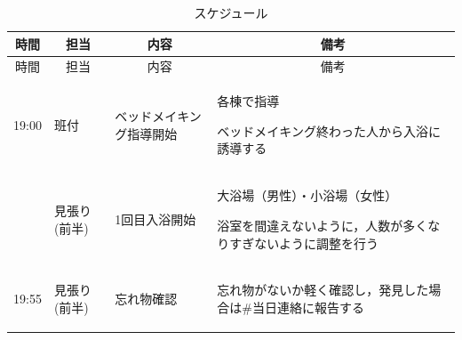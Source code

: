 \begin{longtable}[c]{|p{}|p{}|p{}|p{}|}
  \caption{スケジュール} \\
  \hline
  \multicolumn{1}{|c|}{時間} & \multicolumn{1}{c|}{担当} & \multicolumn{1}{c|}{内容} & \multicolumn{1}{c|}{備考} \\
  \hline
  \endfirsthead
  
  \hline
  \multicolumn{1}{|c|}{時間} & \multicolumn{1}{c|}{担当} & \multicolumn{1}{c|}{内容} & \multicolumn{1}{c|}{備考} \\
  \hline
  \endhead
  
  \hline
  \endfoot
  
  \hline
  \endlastfoot
  
  \begin{tpacol}
    19:00
  \end{tpacol}&
  \begin{tpbcol}
    班付
  \end{tpbcol}&
  \begin{tpccol}
    ベッドメイキング指導開始
  \end{tpccol}&
  \begin{tpdcol}
    各棟で指導 \par
    ベッドメイキング終わった人から入浴に誘導する
  \end{tpdcol}\\

  \begin{tpacol}
    
  \end{tpacol}&
  \begin{tpbcol}
    見張り(前半)
  \end{tpbcol}&
  \begin{tpccol}
    1回目入浴開始
  \end{tpccol}&
  \begin{tpdcol}
    大浴場（男性）・小浴場（女性） \par
    浴室を間違えないように，人数が多くなりすぎないように調整を行う
  \end{tpdcol}\\

  \begin{tpacol}
    19:55
  \end{tpacol}&
  \begin{tpbcol}
    見張り(前半)
  \end{tpbcol}&
  \begin{tpccol}
    忘れ物確認
  \end{tpccol}&
  \begin{tpdcol}
    忘れ物がないか軽く確認し，発見した場合は\#当日連絡に報告する
  \end{tpdcol}\\



\end{longtable}
